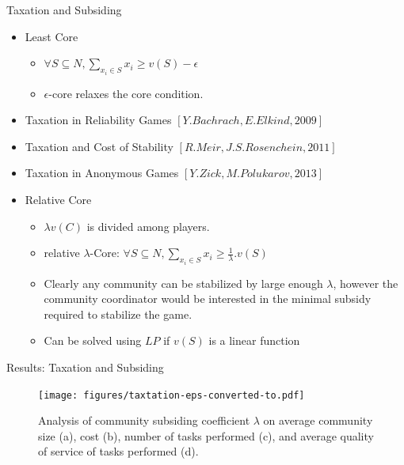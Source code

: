 \documentclass{beamer}
\begin{document}
\begin{frame}{Taxation and Subsiding}
    \begin{itemize}
        \item Least Core
        \begin{itemize}
            \item $\forall S \subseteq N, \sum_{x_i \in S} x_i \geq v(S) - \epsilon$
            \item $\epsilon$-core relaxes the core condition.
        \end{itemize}
        \item Taxation in Reliability Games \small $[Y. Bachrach, E. Elkind, 2009]$

        \item Taxation and Cost of Stability \small $[R. Meir, J. S. Rosenchein, 2011]$

        \item Taxation in Anonymous Games \small $[Y. Zick, M. Polukarov, 2013]$

        \item Relative Core
        \begin{itemize}
            \item $\lambda v(C)$ is divided among players.
            \item relative $\lambda$-Core: $\forall S \subseteq N, \sum_{x_i \in S} x_i \geq \frac{1}{\lambda}.v(S)$
            \item Clearly any community can be stabilized by large enough $\lambda$, however the community coordinator would be interested in the minimal subsidy required to stabilize the game.
            \item Can be solved using $LP$ if $v(S)$ is a linear function
        \end{itemize}
    \end{itemize}
\end{frame}

\begin{frame}{Results: Taxation and Subsiding}
    \begin{figure}[!t]
        \centering
        \texttt{[image: figures/taxtation-eps-converted-to.pdf]}
        \caption{Analysis of community subsiding coefficient $\lambda$ on
        average community size (a), cost (b), number of tasks performed
        (c), and average quality of service of tasks performed (d).}
        \label{f_taxtation}
    \end{figure}
\end{frame}
\end{document}
